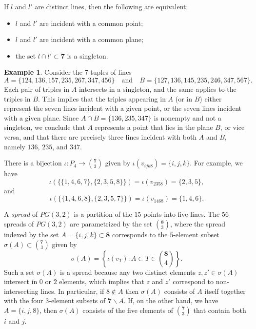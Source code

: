 \documentclass{amsart}
\theoremstyle{plain}
\theoremstyle{definition}
\newtheorem{exa}[theorem]{Example}
\theoremstyle{remark}
\numberwithin{equation}{section}
\newcommand{\seven}{{\mathbf 7}}
\newcommand{\eight}{{\mathbf 8}}
\begin{document}
If $l$ and $l'$ are distinct lines, then the following are equivalent:
\begin{itemize}
\item[(i)]{$l$ and $l'$ are incident with a common point;}
\item[(ii)]{$l$ and $l'$ are incident with a common plane;}
\item[(iii)]{the set $l \cap l' \subset \seven$ is a singleton.}
\end{itemize}

\begin{exa}\label{exa:septuples}
Consider the $7$-tuples of lines $$
A = \{124, 136, 157, 235, 267, 347, 456\} \quad \text{and} \quad B = \{127, 136, 145, 235, 246, 347, 567\}
.$$ Each pair of triples in $A$ intersects in a singleton, and the same applies to the triples in $B$. This implies that 
the triples appearing in $A$ (or in $B$) either represent the seven lines incident with a given point, or the seven lines 
incident with a given plane. Since $A \cap B = \{136, 235, 347\}$ is nonempty and not a singleton, we conclude that $A$ 
represents a point that lies in the plane $B$, or vice versa, and that there are precisely three lines incident with both 
$A$ and $B$, namely $136$, $235$, and $347$.
\end{exa}

There is a bijection $\iota : P_4 \rightarrow \binom{\seven}{3}$ given by 
$\iota(v_{ijk8}) = \{i, j, k\}$. For example, we have $$
\iota(\{\{1, 4, 6, 7\}, \{2, 3, 5, 8\}\}) = \iota(v_{2358}) = \{2, 3, 5\}
,$$ and $$
\iota(\{\{1, 4, 6, 8\}, \{2, 3, 5, 7\}\}) = \iota(v_{1468}) = \{1, 4, 6\}
.$$

A {\it spread} of $PG(3, 2)$ is a partition of the $15$ points into five lines. The $56$ spreads of $PG(3, 2)$ are parametrized 
by the set $\binom{\eight}{3}$, where the spread indexed by the set $A = \{i, j, k\} \subset \eight$ corresponds to
the $5$-element subset $\sigma(A) \subset \binom{\seven}{3}$ given by $$
\sigma(A) = \left\{\iota(v_T) : A \subset T \in \binom{\eight}{4}\right\}
.$$ Such a set $\sigma(A)$ is a spread because any two distinct elements $z, z' \in \sigma(A)$ intersect in $0$ or $2$ 
elements, which implies that $z$ and $z'$ correspond to non-intersecting lines. In particular, if $8 \not\in A$ then 
$\sigma(A)$ consists of $A$ itself together with the four $3$-element subsets of $\seven \backslash A$. If, on the other 
hand, we have $A = \{i, j, 8\}$, then $\sigma(A)$ consists of the five elements of $\binom{\seven}{3}$ that contain 
both $i$ and $j$. 
\end{document}
